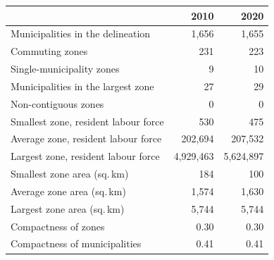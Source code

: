 \begin{tabular}{lrr}
\toprule
& 2010 & 2020 \\
\midrule
Municipalities in the delineation & 1,656 & 1,655 \\
Commuting zones & 231 & 223 \\
Single-municipality zones & 9 & 10 \\
Municipalities in the largest zone & 27 & 29 \\
Non-contiguous zones & 0 & 0 \\[2pt]
Smallest zone, resident labour force & 530 & 475 \\
Average zone, resident labour force & 202,694 & 207,532 \\
Largest zone, resident labour force & 4,929,463 & 5,624,897 \\[2pt]
Smallest zone area (sq.\,km) & 184 & 100 \\
Average zone area (sq.\,km) & 1,574 & 1,630 \\
Largest zone area (sq.\,km) & 5,744 & 5,744 \\[2pt]
Compactness of zones & 0.30 & 0.30 \\
Compactness of municipalities & 0.41 & 0.41 \\
\bottomrule
\end{tabular}

